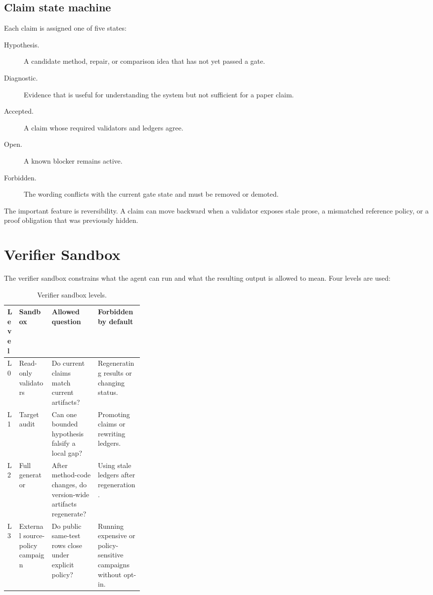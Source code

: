\documentclass[10pt]{article}
\begin{document}
\subsection{Claim state machine}

Each claim is assigned one of five states:
\begin{description}
  \item[Hypothesis.] A candidate method, repair, or comparison idea that has not
  yet passed a gate.
  \item[Diagnostic.] Evidence that is useful for understanding the system but
  not sufficient for a paper claim.
  \item[Accepted.] A claim whose required validators and ledgers agree.
  \item[Open.] A known blocker remains active.
  \item[Forbidden.] The wording conflicts with the current gate state and must
  be removed or demoted.
\end{description}
The important feature is reversibility. A claim can move backward when a
validator exposes stale prose, a mismatched reference policy, or a proof
obligation that was previously hidden.

\section{Verifier Sandbox}

The verifier sandbox constrains what the agent can run and what the resulting
output is allowed to mean. Four levels are used:

\begin{table}[H]
\centering
\caption{Verifier sandbox levels.}
\label{tab:sandbox}
\begin{tabularx}{\linewidth}{p{0.08\linewidth}p{0.24\linewidth}YY}
\toprule
\textbf{Level} & \textbf{Sandbox} & \textbf{Allowed question} & \textbf{Forbidden by default} \\
\midrule
L0 & Read-only validators & Do current claims match current artifacts? & Regenerating results or changing status. \\
L1 & Target audit & Can one bounded hypothesis falsify a local gap? & Promoting claims or rewriting ledgers. \\
L2 & Full generator & After method-code changes, do version-wide artifacts regenerate? & Using stale ledgers after regeneration. \\
L3 & External source-policy campaign & Do public same-test rows close under explicit policy? & Running expensive or policy-sensitive campaigns without opt-in. \\
\bottomrule
\end{tabularx}
\end{table}
\end{document}
